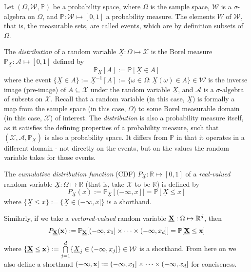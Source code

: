 \documentclass[twoside]{article} \usepackage{aistats2017}
\theoremstyle{definition}
\theoremstyle{remark}
\newcommand{\rv}[1]{\underline{#1}}
\newcommand{\extra}[1]{{\color{ForestGreen} #1}}
\begin{document}
		Let $(\Omega, \mathcal{W}, \mathbb{P})$ be a probability space, where $\Omega$ is the sample space, $\mathcal{W}$ is a $\sigma$-algebra on $\Omega$, and $\mathbb{P} : \mathcal{W} \mapsto [0, 1]$ a probability measure. The elements $W$ of $\mathcal{W}$, that is, the measurable sets, are called events, which are by definition subsets of $\Omega$.
		
		The \textit{distribution} of a random variable $\rv{X} : \Omega \mapsto \mathcal{X}$ is the Borel measure $\mathbb{P}_{\rv{X}} : \mathcal{A} \mapsto [0, 1]$ defined by
		\begin{equation}
			\mathbb{P}_{\rv{X}}[A] := \mathbb{P}[\rv{X} \in A]
		\label{eq:distribution}
		\end{equation}
		where the event $\{\rv{X} \in A\} := \rv{X}^{-1}[A] := \{\omega \in \Omega : \rv{X}(\omega) \in A\} \in \mathcal{W}$ is the inverse image (pre-image) of $A \subseteq \mathcal{X}$ under the random variable $\rv{X}$, and $\mathcal{A}$ is a $\sigma$-algebra of subsets on $\mathcal{X}$. \extra{Recall that a random variable (in this case, $\rv{X}$) is formally a map from the sample space (in this case, $\Omega$) to some Borel measurable domain (in this case, $\mathcal{X}$) of interest. The \textit{distribution} is also a probability measure itself, as it satisfies the defining properties of a probability measure, such that $(\mathcal{X}, \mathcal{A}, \mathbb{P}_{\rv{X}})$ is also a probability space. It differs from $\mathbb{P}$ in that it operates in a different domain - not directly on the events, but on the values the random variable takes for those events.}
		
		The \textit{cumulative distribution function} (CDF) $P_{\rv{X}} : \mathbb{R} \mapsto [0, 1]$ of a \textit{real-valued} random variable $\rv{X} : \Omega \mapsto \mathbb{R}$ (that is, take $\mathcal{X}$ to be $\mathbb{R}$) is defined by
		\begin{equation}
			P_{\rv{X}}(x) := \mathbb{P}_{\rv{X}}[(-\infty, x]] = \mathbb{P}[\rv{X} \leq x]
		\label{eq:cdf}
		\end{equation}
		where $\{\rv{X} \leq x\} := \{\rv{X} \in (-\infty, x]\}$ is a shorthand.

		Similarly, if we take a \textit{vectored-valued} random variable $\bvec{\rv{X}} : \Omega \mapsto \mathbb{R}^{d}$, then 
		\begin{equation}
			P_{\bvec{\rv{X}}}(\bvec{x}) := \mathbb{P}_{\bvec{\rv{X}}}[(-\infty, x_{1}] \times \dots \times (-\infty, x_{d}]] = \mathbb{P}[\bvec{\rv{X}} \leq \bvec{x}]
		\label{eq:cdf_vector}
		\end{equation}
		where $\{\bvec{\rv{X}} \leq \bvec{x}\} := \bigcap\limits_{j = 1}^{d} \{\rv{X}_{j} \in (-\infty, x_{j}]\} \in \mathcal{W}$ is a shorthand. From here on we also define a shorthand $(-\mathbf{\infty}, \mathbf{x}] := (-\infty, x_{1}] \times \dots \times (-\infty, x_{d}]$ for conciseness.
				
\end{document}
